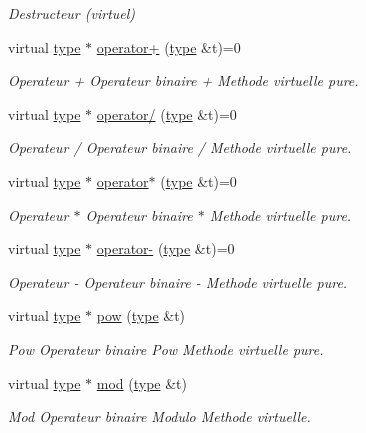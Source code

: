 \begin{DoxyCompactItemize}
\begin{DoxyCompactList}\small\item\em Destructeur (virtuel) \end{DoxyCompactList}\item 
virtual \hyperlink{classtype}{type} $\ast$ \hyperlink{classtype_aae435de533d21af297434702fd71d04d}{operator+} (\hyperlink{classtype}{type} \&t)=0
\begin{DoxyCompactList}\small\item\em Operateur + Operateur binaire + Methode virtuelle pure. \end{DoxyCompactList}\item 
virtual \hyperlink{classtype}{type} $\ast$ \hyperlink{classtype_a0fad8179d45b9bbde90b48e1950ce639}{operator/} (\hyperlink{classtype}{type} \&t)=0
\begin{DoxyCompactList}\small\item\em Operateur / Operateur binaire / Methode virtuelle pure. \end{DoxyCompactList}\item 
virtual \hyperlink{classtype}{type} $\ast$ \hyperlink{classtype_a9e275d2b8465d6085515f58aaf631ea7}{operator$\ast$} (\hyperlink{classtype}{type} \&t)=0
\begin{DoxyCompactList}\small\item\em Operateur $\ast$ Operateur binaire $\ast$ Methode virtuelle pure. \end{DoxyCompactList}\item 
virtual \hyperlink{classtype}{type} $\ast$ \hyperlink{classtype_a4d440ee89d624d7314786d8d18751588}{operator-\/} (\hyperlink{classtype}{type} \&t)=0
\begin{DoxyCompactList}\small\item\em Operateur -\/ Operateur binaire -\/ Methode virtuelle pure. \end{DoxyCompactList}\item 
virtual \hyperlink{classtype}{type} $\ast$ \hyperlink{classtype_a01ae853856fcd929e5455b460ccd0be6}{pow} (\hyperlink{classtype}{type} \&t)
\begin{DoxyCompactList}\small\item\em Pow Operateur binaire Pow Methode virtuelle pure. \end{DoxyCompactList}\item 
virtual \hyperlink{classtype}{type} $\ast$ \hyperlink{classtype_aed752df353b43b17d3f993d4b02f216b}{mod} (\hyperlink{classtype}{type} \&t)
\begin{DoxyCompactList}\small\item\em Mod Operateur binaire Modulo Methode virtuelle. \end{DoxyCompactList}\item 

\end{DoxyCompactItemize}
